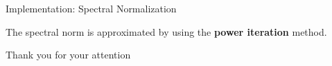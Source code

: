 \documentclass[xcolor=table]{beamer}
\begin{document}
\begin{frame}{Implementation: Spectral Normalization}

The spectral norm is approximated by using the \textbf{power iteration} method.
    
\end{frame}

\begin{frame}{}
    \begin{center}
        Thank you for your attention
    \end{center}
\end{frame}
\end{document}
